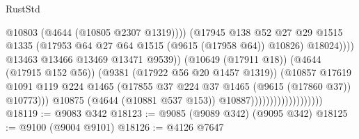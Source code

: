 \begin{lexlean}{RustStd}
\begin{coremodule}
                                                          @10803
                                                          (@4644 (@10805 @2307 @1319))))
                                                      (@17945
                                                        @138
                                                        @52
                                                        @27
                                                        @29
                                                        @1515
                                                        @1335
                                                        (@17953
                                                          @64
                                                          @27
                                                          @64
                                                          @1515
                                                          (@9615 (@17958 @64))
                                                          @10826)
                                                        @18024))))
                                                @13463
                                                @13466
                                                @13469
                                                @13471
                                                @9539))
                                            (@10649 (@17911 @18))
                                            (@4644 (@17915 @152 @56))
                                            (@9381 (@17922 @56 @20 @1457 @1319))
                                            (@10857
                                              @17619
                                              @1091
                                              @119
                                              @224
                                              @1465
                                              (@17855
                                                @37
                                                @224
                                                @37
                                                @1465
                                                (@9615 (@17860 @37))
                                                @10773)))
                                          @10875
                                          (@4644 (@10881 @537 @153))
                                          @10887)))))))))))))))))))
@18119 := @9083 @342
@18123 := @9085 (@9089 @342) (@9095 @342)
@18125 := @9100 (@9004 @9101)
@18126 := @4126 @7647

\end{coremodule}
\end{lexlean}
